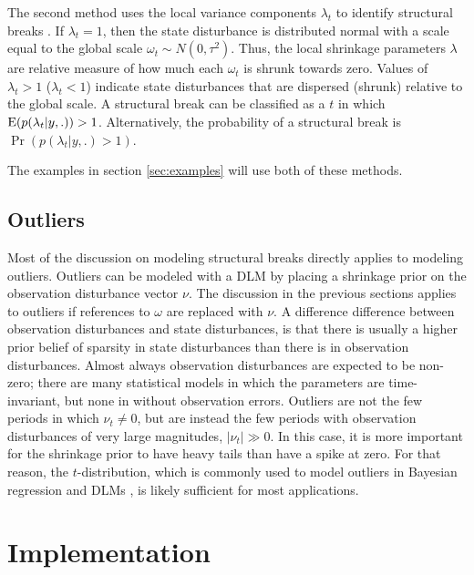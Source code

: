 \documentclass{article}
\begin{document}
The second method uses the local variance components $\lambda_{t}$ to identify structural breaks \parencite[179-180]{PetrisPetroneEtal2009}.
If $\lambda_{t} = 1$, then the state disturbance is distributed normal with a scale equal to the global scale $\omega_{t} \sim N(0, \tau^{2})$.
Thus, the local shrinkage parameters $\lambda$ are relative measure of how much each $\omega_{t}$ is shrunk towards zero.
Values of $\lambda_{t} > 1$ ($\lambda_{t} < 1$) indicate state disturbances that are dispersed (shrunk) relative to the global scale.
A structural break can be classified as a $t$ in which $\operatorname{E} (p(\lambda_{t} | y, .)) > 1$.
Alternatively, the probability of a structural break is $\Pr(p(\lambda_{t} | y, .) > 1)$.

The examples in section \ref{sec:examples} will use both of these methods.

\subsection{Outliers}
\label{sec:outliers}

Most of the discussion on modeling structural breaks directly applies to modeling outliers.
Outliers can be modeled with a DLM by placing a shrinkage prior on the observation disturbance vector $\nu$. 
The discussion in the previous sections applies to outliers if references to $\omega$ are replaced with $\nu$.
A difference difference between observation disturbances and state disturbances, is that there is usually a higher prior belief of sparsity in state disturbances than there is in observation disturbances.
Almost always observation disturbances are expected to be non-zero;
there are many statistical models in which the parameters are time-invariant, but none in without observation errors.%
Outliers are not the few periods in which $\nu_{t} \neq 0$, but are instead the few periods with observation disturbances of very large magnitudes, $|\nu_{t}| \gg 0$.
In this case, it is more important for the shrinkage prior to have heavy tails than have a spike at zero. 
For that reason, the $t$-distribution, which is commonly used to model
outliers in Bayesian regression and DLMs \parencite{West1984}, is
likely sufficient for most applications.

\section{Implementation}
\label{sec:implementation}
\end{document}
